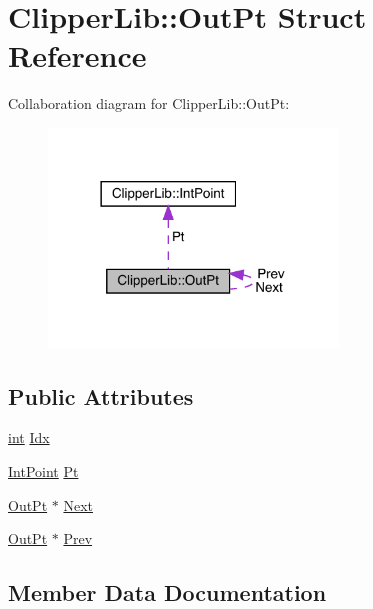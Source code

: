 \hypertarget{struct_clipper_lib_1_1_out_pt}{}\section{Clipper\+Lib\+::Out\+Pt Struct Reference}
\label{struct_clipper_lib_1_1_out_pt}


Collaboration diagram for Clipper\+Lib\+::Out\+Pt\+:
\nopagebreak
\begin{figure}[H]
\begin{center}
\leavevmode
\includegraphics[width=218pt]{struct_clipper_lib_1_1_out_pt__coll__graph}
\end{center}
\end{figure}
\subsection*{Public Attributes}
\begin{DoxyCompactItemize}
\item 
\mbox{\hyperlink{draw_8hh_aa620a13339ac3a1177c86edc549fda9b}{int}} \mbox{\hyperlink{struct_clipper_lib_1_1_out_pt_ad04d3691d47a5d0d9b2ae097e7e7bf10}{Idx}}
\item 
\mbox{\hyperlink{struct_clipper_lib_1_1_int_point}{Int\+Point}} \mbox{\hyperlink{struct_clipper_lib_1_1_out_pt_aa01c2b1e9c5b2d8faa40701178ffcf98}{Pt}}
\item 
\mbox{\hyperlink{struct_clipper_lib_1_1_out_pt}{Out\+Pt}} $\ast$ \mbox{\hyperlink{struct_clipper_lib_1_1_out_pt_a2d605b87f6da37dbdbef990c4fa5819e}{Next}}
\item 
\mbox{\hyperlink{struct_clipper_lib_1_1_out_pt}{Out\+Pt}} $\ast$ \mbox{\hyperlink{struct_clipper_lib_1_1_out_pt_a609eb414d5764e78150cceccaffc5d54}{Prev}}
\end{DoxyCompactItemize}


\subsection{Member Data Documentation}
\mbox{\label{struct_clipper_lib_1_1_out_pt_ad04d3691d47a5d0d9b2ae097e7e7bf10}} 
